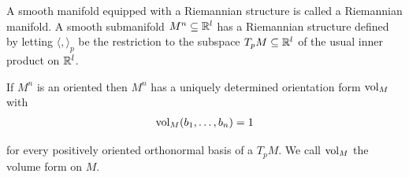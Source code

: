 A smooth manifold equipped with a Riemannian structure is called a Riemannian
manifold. A smooth submanifold $M^n\subseteq{\ensuremath{\mathbb{R}}}^l$ has a Riemannian structure defined
by letting $\langle , \rangle_p$ be the restriction to the subspace $T_pM\subseteq {\ensuremath{\mathbb{R}}}^l$ of 
the usual inner product on ${\mathbb{R}}^l$.

\begin{proposition}\label{prop:9-16}
  If $M^n$ is an oriented  then $M^n$ has a uniquely determined orientation 
  form $\mathrm{vol}_M$ with 
  \begin{align*}
    \mathrm{vol}_M (b_1, \ldots, b_n) = 1
  \end{align*}

  for every positively oriented orthonormal basis of a  $T_pM$. We call
  $\mathrm{vol}_M$ the volume form on $M$.
\end{proposition}

